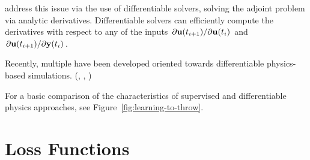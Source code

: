 \cite{holl2019pdecontrol} address this issue via the use of differentiable
solvers, solving the adjoint problem  via analytic derivatives.
Differentiable solvers can efficiently compute the derivatives with respect to
any of the inputs $\pdv*{\vb{u}(t_{i+1})}{\vb{u}(t_i)}$ and
$\pdv*{\vb{u}(t_{i+1})}{\vb{y}(t_i)}$.

Recently, multiple have been developed oriented towards differentiable
physics-based simulations. (\cite{difftaichi},
\cite{holl2019pdecontrol},\cite{warp2022} ) 



For a basic comparison of the characteristics of supervised and differentiable
physics approaches, see Figure~\ref{fig:learning-to-throw}.


\section{Loss Functions}

